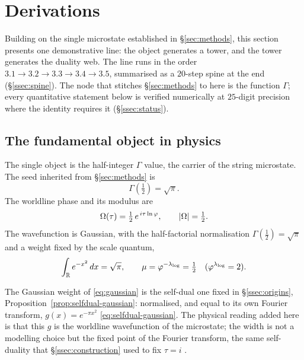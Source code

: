 \section{Derivations}\label{sec:derivations}

Building on the single microstate established in \S\ref{sec:methods}, this section
presents one demonstrative line: the object generates a tower, and the tower generates
the duality web. The line runs in the order $3.1\to3.2\to3.3\to3.4\to3.5$, summarised as a
$20$-step spine at the end (\S\ref{ssec:spine}). The node that stitches \S\ref{sec:methods}
to here is the function $\Gamma$; every quantitative statement below is verified numerically
at $25$-digit precision where the identity requires it (\S\ref{ssec:status}).

\subsection{The fundamental object in physics}\label{ssec:object}
The single object is the half-integer $\Gamma$ value, the carrier of the string microstate.
The seed inherited from \S\ref{sec:methods} is
\begin{equation}\label{eq:gamma-half}
  \Gamma\!\left(\tfrac12\right)=\sqrt{\pi}.
\end{equation}
The worldline phase and its modulus are
\begin{equation}\label{eq:worldline}
  \Omega(\tau)=\tfrac12\,e^{\,i\tau\ln\varphi},\qquad |\Omega|=\tfrac12 .
\end{equation}
The wavefunction is Gaussian, with the half-factorial normalisation $\Gamma(\tfrac12)=\sqrt\pi$
and a weight fixed by the scale quantum,
\begin{equation}\label{eq:gaussian}
  \int_{\mathbb{R}} e^{-x^{2}}\,dx=\sqrt{\pi},\qquad
  \mu=\varphi^{-\lambda_{\log}}=\tfrac12\quad(\varphi^{\lambda_{\log}}=2).
\end{equation}

\begin{remark}\label{rmk:wf-selfdual}
The Gaussian weight of \eqref{eq:gaussian} is the self-dual one fixed in
\S\ref{ssec:origins}, Proposition~\ref{prop:selfdual-gaussian}: normalised, and equal to its own
Fourier transform, $g(x)=e^{-\pi x^{2}}$ \eqref{eq:selfdual-gaussian}. The physical reading added
here is that this $g$ is the worldline wavefunction of the microstate; the width is not a
modelling choice but the fixed point of the Fourier transform, the same self-duality that
\S\ref{ssec:construction} used to fix $\tau=i$ .

\end{remark}

